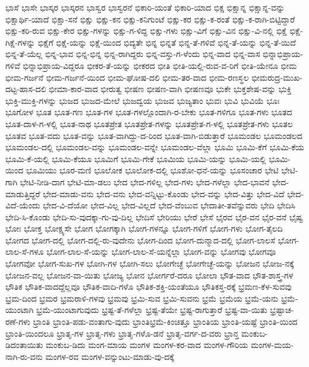 ಭಾಸೆ
ಭಾಸೇ
ಭಾಸ್ಕರ
ಭಾಸ್ಕರನ
ಭಾಸ್ವರ
ಭಾಸ್ವರನೆ
ಭಿಕಾರಿ-ಯಂತೆ
ಭಿಕಾರಿ-ಯಾದ
ಭಿಕ್ಷ
ಭಿಕ್ಷಾನ್ನ
ಭಿಕ್ಷಾನ್ನ-ವನ್ನು
ಭಿಕ್ಷಾರ್ಥಿ-ಯಾದೆ
ಭಿಕ್ಷಾ-ಸನೆ
ಭಿಕ್ಷು
ಭಿಕ್ಷು-ಕನ
ಭಿಕ್ಷು-ಕನಿಗುಂಟೆ
ಭಿಕ್ಷು-ಕರ
ಭಿಕ್ಷು-ಕ-ರಂತೆ
ಭಿಕ್ಷು-ಕ-ರಾಗಿ-ಬಿಟ್ಟಿದ್ದಾರೆ
ಭಿಕ್ಷು-ಕರಿ-ರುವ
ಭಿಕ್ಷು-ಕೇರ
ಭಿಕ್ಷು-ಗಳನ್ನು
ಭಿಕ್ಷು-ಗ-ಳಿದ್ದ
ಭಿಕ್ಷು-ಗಳು
ಭಿಕ್ಷು-ವಿಗೆ
ಭಿಕ್ಷು-ವಿನ
ಭಿಕ್ಷು-ವಿ-ನಲ್ಲಿ
ಭಿಕ್ಷೆ
ಭಿಕ್ಷೆ-ಗಿಕ್ಷೆ-ಗಳನ್ನು
ಭಿಕ್ಷೆಗೆ
ಭಿಕ್ಷೆ-ಯನ್ನು
ಭಿಕ್ಷೆ-ಯಿಂದ
ಭಿದ್ಯತೇ
ಭಿನ್ನ
ಭಿನ್ನತೆ
ಭಿನ್ನ-ತೆ-ಗಳಿವೆ
ಭಿನ್ನ-ತೆ-ಯನ್ನು
ಭಿನ್ನ-ತೆ-ಯಿದೆ
ಭಿನ್ನ-ತೆ-ಯೆಲ್ಲ
ಭಿನ್ನ-ಭಾವ
ಭಿನ್ನ-ಭಿನ್ನ
ಭಿನ್ನ-ರಾಗಿದ್ದರು
ಭಿನ್ನ-ವಸ್ತು-ಗ-ಳೆಂದು
ಭಿನ್ನ-ವಾದ
ಭಿನ್ನ-ವಾಸ
ಭಿನ್ನಾಭಿಪ್ರಾಯ-ಗಳಿವೆ
ಭಿನ್ನಾಭಿಪ್ರಾಯ-ವಿದ್ದರೂ
ಭೀಕರ-ತೆ-ಯನ್ನು
ಭೀಕರದ
ಭೀತಿ
ಭೀತಿ-ಯಲ್ಲಿ-ರುವ-ವ-ರಿಗೆ
ಭೀತಿ-ಯೇನೂ
ಭೀಮ
ಭೀಮ-ಗರ್ಜನೆ
ಭೀಮ-ಗರ್ಜನೆ-ಯಿಂದ
ಭೀಮ-ಘೋಷ-ದಲಿ
ಭೀಮ-ತರ-ವಾದ
ಭೀಮ-ರಣಸ್ಥಲ
ಭೀಮರುದ್ರ-ಮುಖ-ದಟ್ಟ-ಹಾಸ-ದಲಿ
ಭೀಮಾ-ಕಾರ-ವಾದ
ಭೀರುತ್ವ
ಭೀಷಣ
ಭೀಷಣ-ವಾಗಿ
ಭೀಷಣವೂ
ಭುಕೇ
ಭುಕ್ತಶೇಷ-ವನ್ನು
ಭುಕ್ತಿ
ಭುಕ್ತಿ-ಮುಕ್ತಿ-ಗಳನ್ನು
ಭುಜದ
ಭುಜದ-ಮೇಲೆ
ಭುಜದ್ವಯ
ಭುಜವ
ಭುಜ್ಯತಾಂ
ಭುವಃ
ಭುವಿ
ಭುವಿಯೆ
ಭೂಃ
ಭೂಗೋಳ
ಭೂತ
ಭೂತ-ಗಣ
ಭೂತ-ಗಳ
ಭೂತ-ಗಳಲ್ಲೊಂದಾಗಿ-ರ-ಬೇಕು
ಭೂತ-ಗಳಿಗೂ
ಭೂತ-ಗಳು
ಭೂತದ
ಭೂತ-ದಾಳ-ಗ-ಳಲ್ಲಿ
ಭೂತ-ನಾಥ
ಭೂತಪ್ರೇತ
ಭೂತಪ್ರೇತ-ಗಳನ್ನು
ಭೂತಪ್ರೇತ-ಗ-ಳಲ್ಲಿ
ಭೂತಪ್ರೇತ-ಗಳು
ಭೂತಲ
ಭೂತವ
ಭೂತ-ವದು
ಭೂತ-ವನ್ನು
ಭೂತ-ವಾಗಿದ್ದು-ದ-ರಿಂದ
ಭೂತ-ವಾಗಿ-ಬಿಡುತ್ತಾರೆ
ಭೂಮಂಡಲ
ಭೂಮಂಡಲದ
ಭೂಮಂಡಲ-ದಲ್ಲಿ
ಭೂಮಂಡಲ-ವನ್ನು
ಭೂಮಂಡಲ-ವನ್ನೇ
ಭೂಮಂಡಲ-ವೆಲ್ಲಾ
ಭೂಮಿ
ಭೂಮಿ-ಕೆಗೆ
ಭೂಮಿ-ಕೆಯ
ಭೂಮಿ-ಕೆ-ಯಲ್ಲಿ
ಭೂಮಿ-ಕೆಯೂ
ಭೂಮಿಗೆ
ಭೂಮಿ-ಗೇಕೆ
ಭೂಮಿಯ
ಭೂಮಿ-ಯನ್ನು
ಭೂಮಿ-ಯಲ್ಲಿ
ಭೂಮಿ-ಯಿಂದ
ಭೂಮಿಯು
ಭೂರ-ಮಣಿ
ಭೂಲೋಕ
ಭೂಲೋಕ-ದಲ್ಲಿ
ಭೂಶೋ-ಧನೆ-ಯನ್ನು
ಭೂಸಂಚಾರ
ಭೇಟಿ
ಭೇಟಿ-ಗಾಗಿ
ಭೇಟಿ-ನೀಡಿ-ದಾಗ
ಭೇಟಿ-ಮಾ-ಡಲು
ಭೇದ
ಭೇದ-ಗಳಿಲ್ಲ
ಭೇದ-ಗಳು
ಭೇದ-ಗಳೆಲ್ಲಾ
ಭೇದ-ಭಾವನೆ
ಭೇದ-ಮಾಡುತ್ತಿದ್ದರೆ
ಭೇದ-ಮಾಡು-ವನು
ಭೇದ-ವನು
ಭೇದ-ವನ್ನಿಟ್ಟು-ಕೊಂಡು
ಭೇದ-ವನ್ನು
ಭೇದ-ವಿತ್ತು
ಭೇದ-ವಿದೆ
ಭೇದ-ವಿದೆ-ಯೆಂದು
ಭೇದ-ವಿ-ದೆಯೋ
ಭೇದ-ವಿಲ್ಲ
ಭೇದ-ವಿಲ್ಲದೆ
ಭೇದ-ವೆಂಬುವ
ಭೇದಾತೀ-ತವೆನ್ನುವರು
ಭೇದಿ
ಭೇದಿಸಿ
ಭೇದಿ-ಸಿ-ಕೊಂಡು
ಭೇದಿ-ಸು-ವುದಕ್ಕಾ-ಗು-ವು-ದಿಲ್ಲ
ಭೇದಿಸೆ
ಭೇರಿಯು
ಭೇರೆ
ಭೇಸೆ
ಭೈರವ
ಭೈರ-ವನ
ಭೈರ-ವನೆ
ಭೈಷ್ವ
ಭೋಃ
ಭೋಕ್ತ
ಭೋಕ್ಷ್ಯಸೇ
ಭೋಗ
ಭೋಗಕ್ಕಾಗಿ
ಭೋಗ-ಗಳನ್ನೂ
ಭೋಗ-ಗಳಿಗೆ
ಭೋಗ-ಗಳು
ಭೋಗ-ತೈಲದಿ
ಭೋಗದ
ಭೋಗ-ದಲ್ಲಿ
ಭೋಗ-ದಲ್ಲಿ-ರು-ವುದೇನು
ಭೋಗ-ದಿಂದ
ಭೋಗ-ದುನ್ಮಾದ-ದಲ್ಲಿ
ಭೋಗ-ಲಾಲಸೆ
ಭೋಗ-ಲಾಲ-ಸೆ-ಗಳೂ
ಭೋಗ-ಲಾಲ-ಸೆ-ಯನ್ನು
ಭೋಗ-ಲಾಲ-ಸೆ-ಯನ್ನೆಲ್ಲಾ
ಭೋಗ-ವನ್ನು
ಭೋಗವು
ಭೋಗವೂ
ಭೋಗವೋ
ಭೋಗ-ಸುಖ-ಗಳ
ಭೋಗಿ-ಗಳ
ಭೋಗಿ-ಸಲು
ಭೋಗೇಚ್ಛೆ
ಭೋಗೇಚ್ಛೆ-ಯನ್ನು
ಭೋಜನ
ಭೋಜ-ನಕ್ಕೆ
ಭೋಜನ-ವಲ್ಲ
ಭೋಜನ-ವಾ-ಯಿತು
ಭೋಜ್ಯ
ಭೋನ
ಭೋರ್ಗರೆ-ದರೂ
ಭೋಲಾ
ಭೌತ-ವಾದ
ಭೌತ-ಶಾಸ್ತ್ರ-ಗಳ
ಭೌತಿಕ
ಭೌತಿಕ-ವಾದದ್ದೆಲ್ಲವೂ
ಭೌತಿಕ-ವಾದಿ-ಗಳೊ
ಭೌತಿಕ-ಶಕ್ತಿ-ಯಂತೆಯೂ
ಭೌತಿಕಸ್ತ-ರಕ್ಕೆ
ಭ್ರಮಣ-ಕೆಳ-ಸುವವು
ಭ್ರಮ-ದಿಂದ
ಭ್ರಮರ
ಭ್ರಮರಾಳಿ-ಗಳವು
ಭ್ರಮವು
ಭ್ರಮಿ-ಸುವ
ಭ್ರಮಿ-ಸುವನು
ಭ್ರಮೆ
ಭ್ರಮೆಯ
ಭ್ರಮೆ-ಯನು
ಭ್ರಮೆ-ಯುಂಟಾಗಿ
ಭ್ರಮೆ-ಯುಂಟಾಗುವುದು
ಭ್ರಷ್ಟ-ತೆ-ಗಳೆಲ್ಲಾ
ಭ್ರಷ್ಟ-ತೆಯೇ
ಭ್ರಷ್ಟ-ರಾಗುತ್ತಾರೆ
ಭ್ರಷ್ಟ-ವಾ-ಯಿತು
ಭ್ರಷ್ಟಾಚ-ರಣೆ-ಗಳು
ಭ್ರಾಂತಿ
ಭ್ರಾಂತಿ-ಪಡು-ವಂತಾಗು-ವುದು
ಭ್ರಾಂತಿಭ್ರಮೆ-ಕಿಂಚಿತ್ತೂ
ಭ್ರಾಂತಿಯ
ಭ್ರಾಂತಿ-ಯಷ್ಟೆ
ಭ್ರಾಂತಿ-ಯಿಂದ
ಭ್ರಾಂತಿ-ಯಿಂದಲೂ
ಭ್ರಾತೃ-ಗಳ
ಭ್ರಾತೃ-ಗಳು
ಭ್ರಾತೃ-ಗಳೊ-ಡನೆ
ಭ್ರಾತೃ-ವರ್ಗ-ದ-ವರು
ಭ್ರಾನ್ತ
ಮಂಕುಬ-ಡಿದಂತಾಯಿತು
ಮಂಕುಬ-ಡಿದು
ಮಂಗ-ಮಾಯ
ಮಂಗಳ
ಮಂಗಳ-ಕರ-ವಾದ
ಮಂಗಳ-ಗೌರಿಯ
ಮಂಗಳ-ಮಯ-ನಾಗಿ-ರು-ವನು
ಮಂಗಳ-ರವ
ಮಂಗಳ-ವನ್ನುಂಟು-ಮಾಡು-ವು-ದಕ್ಕೆ
